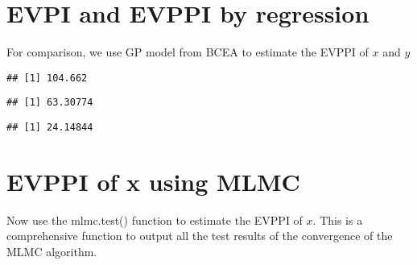 \documentclass[
]{article}
\newenvironment{Shaded}{\begin{snugshade}}{\end{snugshade}}
\newcommand{\CommentTok}[1]{\textcolor[rgb]{0.56,0.35,0.01}{\textit{#1}}}
\newcommand{\NormalTok}[1]{#1}
\newcommand{\OperatorTok}[1]{\textcolor[rgb]{0.81,0.36,0.00}{\textbf{#1}}}
\begin{document}
\hypertarget{evpi-and-evppi-by-regression}{%
\section{EVPI and EVPPI by
regression}\label{evpi-and-evppi-by-regression}}

For comparison, we use GP model from BCEA to estimate the EVPPI of \(x\)
and \(y\)

\begin{Shaded}
\end{Shaded}

\begin{verbatim}
## [1] 104.662
\end{verbatim}

\begin{Shaded}
\end{Shaded}

\begin{verbatim}
## [1] 63.30774
\end{verbatim}

\begin{Shaded}
\end{Shaded}

\begin{verbatim}
## [1] 24.14844
\end{verbatim}

\hypertarget{evppi-of-x-using-mlmc}{%
\section{EVPPI of x using MLMC}\label{evppi-of-x-using-mlmc}}

Now use the mlmc.test() function to estimate the EVPPI of \(x\). This is
a comprehensive function to output all the test results of the
convergence of the MLMC algorithm.
\end{document}
